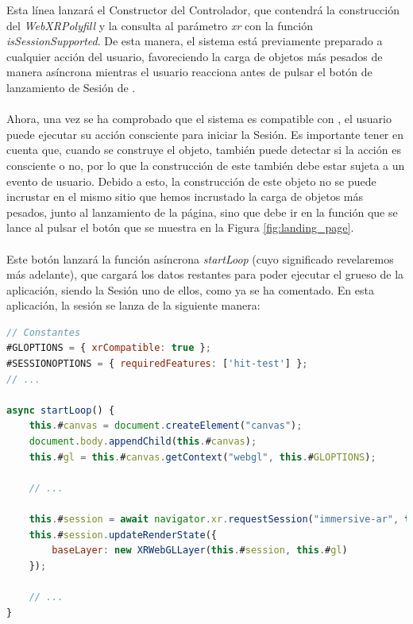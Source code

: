 \documentclass{subfiles}
\begin{document}
        Esta línea lanzará el Constructor del Controlador, que contendrá la construcción del \textit{WebXRPolyfill} y la consulta al parámetro \textit{xr} con la función \textit{isSessionSupported}. De esta manera, el sistema está previamente preparado a cualquier acción del usuario, favoreciendo la carga de objetos más pesados de manera asíncrona mientras el usuario reacciona antes de pulsar el botón de lanzamiento de Sesión de \ra.

        \paragraph{}
        Ahora, una vez se ha comprobado que el sistema es compatible con \ra, el usuario puede ejecutar su acción consciente para iniciar la Sesión. Es importante tener en cuenta que, cuando se construye el objeto, también puede detectar si la acción es consciente o no, por lo que la construcción de este también debe estar sujeta a un evento de usuario. Debido a esto, la construcción de este objeto no se puede incrustar en el mismo sitio que hemos incrustado la carga de objetos más pesados, junto al lanzamiento de la página, sino que debe ir en la función que se lance al pulsar el botón que se muestra en la Figura \ref{fig:landing_page}.

        \paragraph{}
        Este botón lanzará la función asíncrona \textit{startLoop} (cuyo significado revelaremos más adelante), que cargará los datos restantes para poder ejecutar el grueso de la aplicación, siendo la Sesión uno de ellos, como ya se ha comentado. En esta aplicación, la sesión se lanza de la siguiente manera:

\begin{lstlisting}[language=JavaScript, caption={Función de preparación del bucle.}, label={lst:2.4}]
// Constantes
#GLOPTIONS = { xrCompatible: true };
#SESSIONOPTIONS = { requiredFeatures: ['hit-test'] };
// ...

async startLoop() {
    this.#canvas = document.createElement("canvas");
    document.body.appendChild(this.#canvas);
    this.#gl = this.#canvas.getContext("webgl", this.#GLOPTIONS);

    // ...
    
    this.#session = await navigator.xr.requestSession("immersive-ar", this.#SESSIONOPTIONS);
    this.#session.updateRenderState({
        baseLayer: new XRWebGLLayer(this.#session, this.#gl)
    });

    // ...
}
\end{lstlisting}
        
\end{document}
